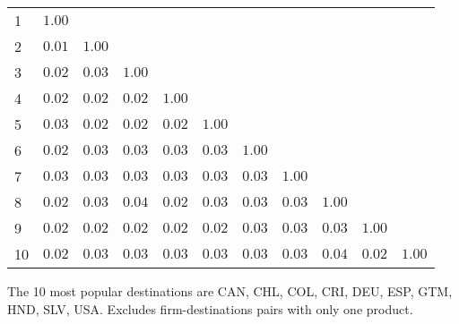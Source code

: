 \documentclass{article}
\begin{document}
\begin{table}[h]
{\begin{threeparttable}
\begin{tabular}{lrrrrrrrrrr}
\cmidrule{2-11} 
1  & $1.00$    &              &             &             &              &            &               &            &              &                        \\  
2  & $0.01$    & $1.00$     &             &             &              &            &               &            &              &                        \\  
3  & $0.02$    & $0.03$     & $1.00$    &             &              &            &               &            &              &                        \\  
4  & $0.02$    & $0.02$     & $0.02$    &  $1.00$   &              &            &               &            &              &                        \\  
5  & $0.03$    & $0.02$     & $0.02$    &  $0.02$   & $1.00$     &            &               &            &              &                        \\  
6  & $0.02$    & $0.03$     & $0.03$    &  $0.03$   & $0.03$     &  $1.00$  &               &            &              &                        \\  
7  & $0.03$    & $0.03$     & $0.03$    &  $0.03$   & $0.03$     &  $0.03$  &  $1.00$     &            &              &                        \\  
8  & $0.02$    & $0.03$     & $0.04$    &  $0.02$   & $0.03$     &  $0.03$  &  $0.03$     & $1.00$   &              &                        \\  
9  & $0.02$    & $0.02$     & $0.02$    &  $0.02$   & $0.02$     &  $0.03$  &  $0.03$     & $0.03$   & $1.00$     &                        \\  
10 & $0.02$   & $0.03$    & $0.03$   &  $0.03$  & $0.03$    &  $0.03$ &  $0.03$    & $0.04$  & $0.02$    &   $1.00$           \\  
\hline
\hline
\end{tabular}
\begin{tablenotes}
\small
\item  \noindent  \footnotesize{The 10 most popular destinations are CAN, CHL, COL, CRI, DEU, ESP, GTM, HND, SLV, USA. Excludes firm-destinations pairs with only one product.}
\end{tablenotes}
\end{threeparttable}
}
\end{table}
\end{document}
